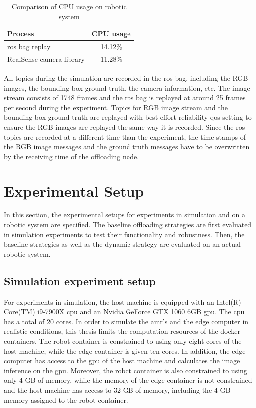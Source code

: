 \begin{table}[htp]
    \centering
    \begin{tabular}{lc}
    \toprule
    Process&                    CPU usage\\
    \midrule
    \gls{ros} bag replay&       14.12\%\\
    RealSense camera library&   11.28\%\\
    \bottomrule
    \end{tabular}
    \caption{Comparison of CPU usage on robotic system}
    \label{tab:ros_bag_comparison}
\end{table}

All topics during the simulation are recorded in the \gls{ros} bag, including the RGB images, the bounding box ground truth, the camera information, etc. The image stream consists of 1748 frames and the \gls{ros} bag is replayed at around 25 frames per second during the experiment. Topics for RGB image stream and the bounding box ground truth are replayed with best effort reliability \gls{qos} setting to ensure the RGB images are replayed the same way it is recorded. Since the \gls{ros} topics are recorded at a different time than the experiment, the time stamps of the RGB image messages and the ground truth messages have to be overwritten by the receiving time of the offloading node.

\section{Experimental Setup}\label{sec:experiment_setup}

In this section, the experimental setups for experiments in simulation and on a robotic system are specified. The baseline offloading strategies are first evaluated in simulation experiments to test their functionality and robustness. Then, the baseline strategies as well as the dynamic strategy are evaluated on an actual robotic system. 

\subsection{Simulation experiment setup}

For experiments in simulation, the host machine is equipped with an Intel(R) Core(TM) i9-7900X \gls{cpu} and an Nvidia GeForce GTX 1060 6GB \gls{gpu}. The \gls{cpu} has a total of 20 cores. In order to simulate the \gls{amr}'s and the edge computer in realistic conditions, this thesis limits the computation resources of the \gls{docker} containers. The robot container is constrained to using only eight cores of the host machine, while the edge container is given ten cores. In addition, the edge computer has access to the \gls{gpu} of the host machine and calculates the image inference on the \gls{gpu}. Moreover, the robot container is also constrained to using only 4 GB of memory, while the memory of the edge container is not constrained and the host machine has access to 32 GB of memory, including the 4 GB memory assigned to the robot container.

